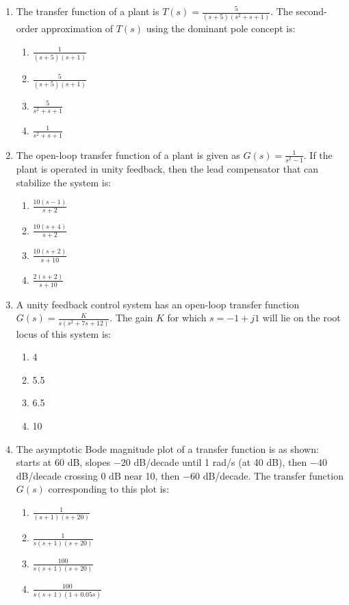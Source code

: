 \documentclass[journal,12pt,onecolumn]{IEEEtran}
\theoremstyle{remark}
\begin{document}
\begin{enumerate}
\item The transfer function of a plant is
$
T(s)=\frac{5}{(s+5)(s^2+s+1)}.
$
The second-order approximation of $T(s)$ using the dominant pole concept is: 
\hfill{}
\begin{multicols}{4}
\begin{enumerate}[label=(\Alph*)]
    \item $\frac{1}{(s+5)(s+1)}$
    \item $\frac{5}{(s+5)(s+1)}$
    \item $\frac{5}{s^2+s+1}$
    \item $\frac{1}{s^2+s+1}$
\end{enumerate}
\end{multicols}

\item The open-loop transfer function of a plant is given as $G(s)=\frac{1}{s^2-1}$. If the plant is operated in unity feedback, then the lead compensator that can stabilize the system is: 
\hfill{}
\begin{multicols}{4}
\begin{enumerate}
    \item $\frac{10(s-1)}{s+2}$
    \item $\frac{10(s+4)}{s+2}$
    \item $\frac{10(s+2)}{s+10}$
    \item $\frac{2(s+2)}{s+10}$
\end{enumerate}
\end{multicols}

\item A unity feedback control system has an open-loop transfer function
$
G(s)=\frac{K}{s(s^2+7s+12)}.
$
The gain $K$ for which $s=-1+j1$ will lie on the root locus of this system is:
\hfill{}
\begin{multicols}{4}
\begin{enumerate}
    \item 4
    \item 5.5
    \item 6.5
    \item 10
\end{enumerate}
\end{multicols}

\item The asymptotic Bode magnitude plot of a transfer function is as shown: starts at 60 dB, slopes $-20$ dB/decade until 1 rad/s (at 40 dB), then $-40$ dB/decade crossing 0 dB near 10, then $-60$ dB/decade. The transfer function $G(s)$ corresponding to this plot is: 
\hfill{}
\begin{multicols}{4}
\begin{enumerate}
    \item $\frac{1}{(s+1)(s+20)}$
    \item $\frac{1}{s(s+1)(s+20)}$
    \item $\frac{100}{s(s+1)(s+20)}$
    \item $\frac{100}{s(s+1)(1+0.05s)}$
\end{enumerate}
\end{multicols}


\end{enumerate}
\end{document}
